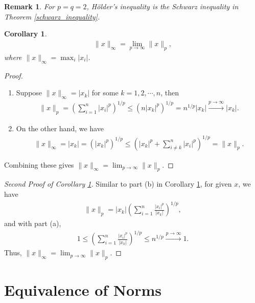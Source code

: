\documentclass[11pt]{book}
\newtheorem{corollary}{Corollary}[theorem]
\newtheorem{remark}{Remark}[section]
\theoremstyle{definition}
\numberwithin{equation}{chapter}
\begin{document}
\begin{remark}
For $p = q = 2$, Hölder's inequality is the Schwarz inequality in Theorem \ref{schwarz_inequality}.
\end{remark}

\medskip

\begin{corollary}\label{norm_limit_corollary}
\begin{align*}
    \|x\|_\infty = \lim_{p\to\infty} \|x\|_p,
\end{align*}
where $\|x\|_\infty = \max_{i}|x_i|$.
\end{corollary}
\begin{proof}
~\begin{enumerate}[label=(\alph*)]
    \item Suppose $\|x\|_\infty = |x_k|$ for some $k = 1,2,\cdots, n$, then
    \begin{align*}
        \|x\|_p = \left(\sum^n_{i=1}|x_i|^p\right)^{1/p} \leq \left(n |x_k|^p\right)^{1/p} = n^{1/p} |x_k| \xrightarrow[]{p\to\infty} |x_k|.
    \end{align*}
    
    \item On the other hand, we have
    \begin{align*}
        \|x\|_\infty = |x_k| = \left(|x_k|^p\right)^{1/p} \leq \left(|x_k|^p + \sum^n_{i\neq k} |x_i|^p \right)^{1/p} = \|x\|_p.
    \end{align*}
\end{enumerate}
Combining these gives $\|x\|_\infty = \lim_{p\to\infty} \|x\|_p$.
\end{proof}

\begin{proof}[Second Proof of Corollary \ref{norm_limit_corollary}]
Similar to part (b) in Corollary \ref{norm_limit_corollary}, for given $x$, we have
\begin{align*}
    \|x\|_p = |x_k| \left(\sum^n_{i=1} \frac{|x_i|^p}{|x_k|} \right)^{1/p},
\end{align*}
and with part (a),
\begin{align*}
    1 \leq \left(\sum^n_{i=1} \frac{|x_i|^p}{|x_k|} \right)^{1/p} \leq n^{1/p} \xrightarrow[]{p\to\infty} 1.
\end{align*}
Thus, $\|x\|_\infty = \lim_{p\to\infty} \|x\|_p$.
\end{proof}

\medskip

\section{Equivalence of Norms}
\end{document}
